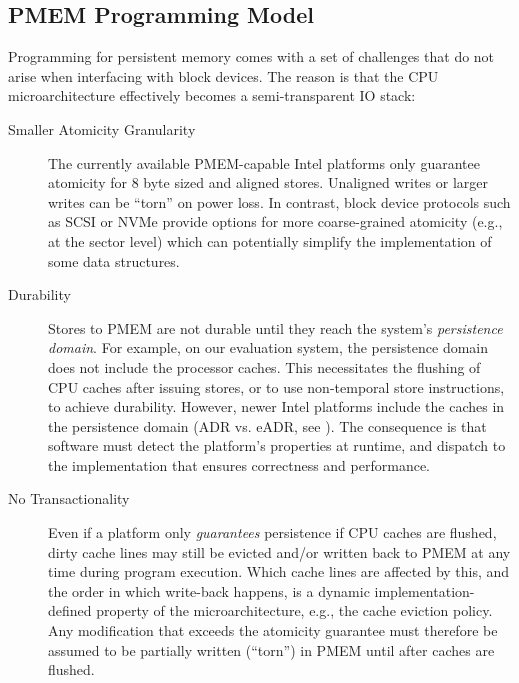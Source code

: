 \documentclass[12pt,a4paper,twoside]{book}
\begin{document}
\subsection{PMEM Programming Model}\label{sec:background:pmemprogrammingmodel}

Programming for persistent memory comes with a set of challenges that do not arise when interfacing with block devices.
The reason is that the CPU microarchitecture effectively becomes a semi-transparent IO stack:

\begin{description}
    \item[Smaller Atomicity Granularity] The currently available PMEM-capable Intel platforms only guarantee atomicity for 8 byte sized and aligned stores.
        Unaligned writes or larger writes can be ``torn'' on power loss.
        In contrast, block device protocols such as SCSI or NVMe provide options for more coarse-grained atomicity (e.g., at the sector level) which can potentially simplify the implementation of some data structures.
        \cite{rudoffPersistentMemoryProgramming2017,AreDiskSectorWritesAtomic}

    \item[Durability] Stores to PMEM are not durable until they reach the system's \textit{persistence domain}.
        For example, on our evaluation system, the persistence domain does not include the processor caches.
        This necessitates the flushing of CPU caches after issuing stores, or to use non-temporal store instructions, to achieve durability.
        However, newer Intel platforms include the caches in the persistence domain (ADR vs. eADR, see \cite{EADRNewOpportunities}).
        The consequence is that software must detect the platform's properties at runtime, and dispatch to the implementation that ensures correctness and performance.
        \cite{rudoffPersistentMemoryProgramming2017}

    \item[No Transactionality] Even if a platform only \textit{guarantees} persistence if CPU caches are flushed, dirty cache lines may still be evicted and/or written back to PMEM at any time during program execution.
        Which cache lines are affected by this, and the order in which write-back happens, is a dynamic implementation-defined property of the microarchitecture, e.g., the cache eviction policy.
        Any modification that exceeds the atomicity guarantee must therefore be assumed to be partially written (``torn'') in PMEM until after caches are flushed.~\cite{Scargall2020}


\end{description}
\end{document}
